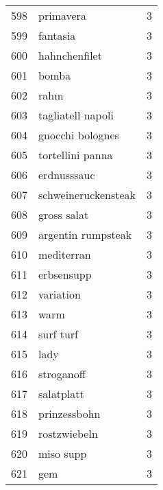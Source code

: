 \begin{tabular}{llr}
598  &                                          primavera &      3 \\
599  &                                           fantasia &      3 \\
600  &                                      hahnchenfilet &      3 \\
601  &                                              bomba &      3 \\
602  &                                               rahm &      3 \\
603  &                                  tagliatell napoli &      3 \\
604  &                                   gnocchi bolognes &      3 \\
605  &                                   tortellini panna &      3 \\
606  &                                        erdnusssauc &      3 \\
607  &                                schweineruckensteak &      3 \\
608  &                                        gross salat &      3 \\
609  &                                 argentin rumpsteak &      3 \\
610  &                                         mediterran &      3 \\
611  &                                         erbsensupp &      3 \\
612  &                                          variation &      3 \\
613  &                                               warm &      3 \\
614  &                                          surf turf &      3 \\
615  &                                               lady &      3 \\
616  &                                         stroganoff &      3 \\
617  &                                         salatplatt &      3 \\
618  &                                       prinzessbohn &      3 \\
619  &                                       rostzwiebeln &      3 \\
620  &                                          miso supp &      3 \\
621  &                                                gem &      3 \\

\end{tabular}
